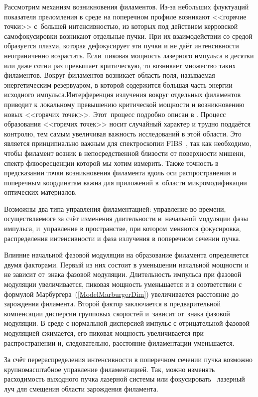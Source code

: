 Рассмотрим механизм возникновения филаментов. Из-за небольших флуктуаций показателя преломления
в среде на поперечном профиле возникают <<горячие точки>> с~большей интенсивностью, из которых под действием керровской самофокусировки
возникают отдельные пучки. При их взаимодействии со средой образуется плазма, которая дефокусирует эти пучки
и не даёт интенсивности неограниченно возрастать. \mbox{Если пиковая} мощность лазерного импульса в десятки или даже сотни раз превышает критическую,
то возникает множество таких филаментов.  Вокруг филаментов возникает область поля, называемая энергетическим резервуаром,
в которой содержится большая часть энергии исходного импульса.Интерференция излучения вокруг отдельных филаментов приводит к локальному превышению
критической мощности и возникновению новых <<горячих точек>>. Этот~процесс подробно описан в \cite{CenturionPuTsangPsaltis2005}.
Процесс образования <<горячих точек>> носит случайный характер и трудно поддаётся контролю, тем самым увеличивая
важность исследований в этой области. Это является принципиально важным для спектроскопии
FIBS~\cite{RohwetterMejeanStelmaszczyk2004}, так как необходимо, чтобы филамент возник в непосредственной
близости от поверхности мишени, спектр флюоресценции которой мы хотим измерить. Также точность в предсказании точки возникновения филамента вдоль оси распространения и поперечным координатам
важна для приложений в~области микромодификации оптических материалов.


Возможны два типа управления филаментацией: управление во времени, осуществляемоге
за счёт изменения длительности и~начальной модуляции фазы импульса, и~управление в пространстве,
при котором меняются фокусировка, распределения интенсивности и фаза излучения в
поперечном сечении пучка.


Влияние начальной фазовой модуляции на образование филамента определяется двумя факторами.
Первый из них состоит в уменьшении начальной мощности и не зависит от~знака фазовой
модуляции. Длительность импульса при фазовой модуляции увеличивается, пиковая мощность
уменьшается и в соответствии с формулой Марбургера~(\ref{ModelMarburgerDim}) увеличивается расстояние до зарождения
филамента. Второй фактор заключается в предварительной компенсации дисперсии групповых скоростей
и~зависит от~знака фазовой модуляции. В среде с нормальной дисперсией импульс с отрицательной
фазовой модуляцией сжимается, его пиковая мощность увеличивается при распространении и,
следовательно, расстояние филаментации уменьшается.


За счёт перераспределения интенсивности в поперечном сечении пучка возможно крупномасштабное
управление филаментацией. Так, можно изменять расходимость выходного пучка лазерной системы
или фокусировать~\cite{FibichSivanEhlrich2006} лазерный луч для смещения области зарождения филамента.


